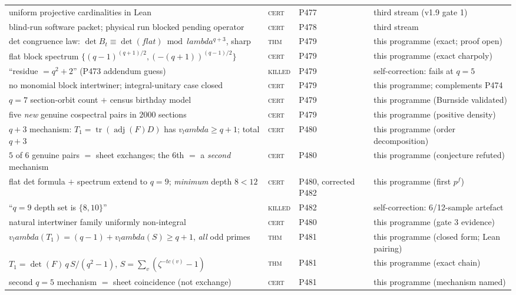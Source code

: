 \documentclass[12pt,a4paper]{article}
\def\mathrm#1{#1}%
\def\textbf#1{#1}%
\def\lambda{lambda}%
\theoremstyle{definition}
\begin{document}
\begin{center}
\begin{tabular}{@{}p{}llp{}@{}}
uniform projective cardinalities in Lean & \textsc{cert} & P477 & third stream (v1.9 gate 1) \\
blind-run software packet; physical run blocked pending operator & \textsc{cert} & P478 & third stream \\
det congruence law: $\det B_t \equiv \det(\mathrm{flat}) \bmod \lambda^{q+3}$, sharp & \textsc{thm} & P479 & this programme (exact; proof open) \\
flat block spectrum $\{(q{-}1)^{(q+1)/2},(-(q{+}1))^{(q-1)/2}\}$ & \textsc{cert} & P479 & this programme (exact charpoly) \\
``residue $= q^2{+}2$'' (P473 addendum guess) & \textsc{killed} & P479 & self-correction: fails at $q{=}5$ \\
no monomial block intertwiner; integral-unitary case closed & \textsc{cert} & P479 & this programme; complements P474 \\
$q{=}7$ section-orbit count $+$ census birthday model & \textsc{cert} & P479 & this programme (Burnside validated) \\
five \emph{new} genuine cospectral pairs in $2000$ sections & \textsc{cert} & P479 & this programme (positive density) \\
$q{+}3$ mechanism: $T_1=\operatorname{tr}(\operatorname{adj}(F)D)$ has $v_\lambda\ge q{+}1$; total $q{+}3$ & \textsc{cert} & P480 & this programme (order decomposition) \\
$5$ of $6$ genuine pairs $=$ sheet exchanges; the $6$th $=$ a \emph{second} mechanism & \textsc{cert} & P480 & this programme (conjecture refuted) \\
flat det formula $+$ spectrum extend to $q{=}9$; \emph{minimum} depth $8<12$ & \textsc{cert} & P480, \textbf{corrected P482} & this programme (first $p^f$) \\
``$q{=}9$ depth set is $\{8,10\}$'' & \textsc{killed} & P482 & self-correction: 6/12-sample artefact \\
natural intertwiner family uniformly non-integral & \textsc{cert} & P480 & this programme (gate 3 evidence) \\
$v_\lambda(T_1)=(q{-}1)+v_\lambda(S)\ge q{+}1$, \emph{all} odd primes & \textsc{thm} & P481 & this programme (closed form; Lean pairing) \\
$T_1=\det(F)\,q\,S/(q^2{-}1)$, $S=\sum_v(\zeta^{-tc(v)}{-}1)$ & \textsc{thm} & P481 & this programme (exact chain) \\
second $q{=}5$ mechanism $=$ sheet coincidence (not exchange) & \textsc{cert} & P481 & this programme (mechanism named) \\

\end{tabular}
\end{center}
\end{document}
